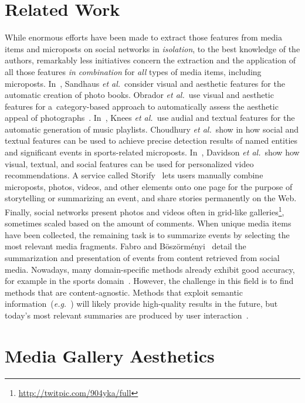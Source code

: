 \section{Related Work}
While enormous efforts have been made to extract those features
from media items and microposts on social networks in \emph{isolation},
to the best knowledge of the authors, remarkably less initiatives 
concern the extraction and the application
of all those features \emph{in combination}
for \emph{all} types of media items, including microposts.
In~\cite{Photo2011}, Sandhaus \emph{et al.}\ consider visual and
aesthetic features for the automatic creation of photo books.
Obrador \emph{et al.}\ use visual and aesthetic features
for a~category-based approach to automatically assess
the aesthetic appeal of photographs~\cite{Photo2012}.
In~\cite{Playlist2006}, Knees \emph{et al.}\ use audial and textual
features for the automatic generation of music playlists.
Choudhury \emph{et al.}\ show in\cite{Sports2011} how social and textual
features can be used to achieve precise detection results 
of named entities and significant events in sports-related microposts.
In~\cite{YouTube2010}, Davidson \emph{et al.}\ show how visual,
textual, and social features can be used for personalized video recommendations.
A service called Storify~\cite{Storify2011} lets users manually combine
microposts, photos, videos, and other elements onto one page for the purpose
of storytelling or summarizing an event,
and share stories permanently on the Web.
Finally, social networks present photos and videos
often in grid-like galleries\footnote{\url{http://twitpic.com/904yka/full}}, sometimes scaled
based on the amount of comments.
When unique media items have been collected, the remaining task is to summarize events by selecting the most relevant media fragments. Fabro and B\"osz\"orm\'enyi~\cite{Fabro:MMM12} detail the summarization and presentation of events from content retrieved from social media. Nowadays, many domain-specific methods already exhibit good accuracy, for example in the sports domain~\cite{Li1,Li2}. However, the challenge in this field is to find methods that are content-agnostic. Methods that exploit semantic information~(\emph{e.g.}~\cite{Chen}) will likely provide high-quality results in the future, but today's most relevant summaries are produced by user interaction~\cite{Olsen}.

\section{Media Gallery Aesthetics}

